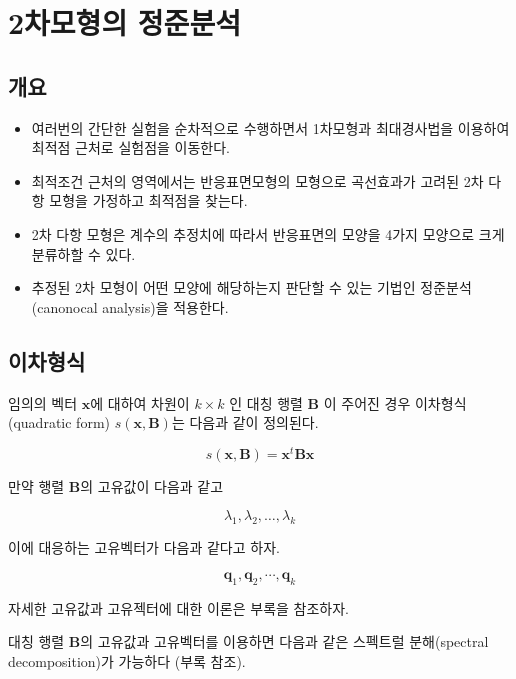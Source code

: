 \documentclass[
]{book}
\newcommand{\bm}[1]{\boldsymbol{\mathbf{#1}}}
\theoremstyle{definition}
\theoremstyle{definition}
\theoremstyle{definition}
\theoremstyle{definition}
\theoremstyle{remark}
\begin{document}
\hypertarget{canonocal}{%
\chapter{2차모형의 정준분석}\label{canonocal}}

\hypertarget{uxac1cuxc694-2}{%
\section{개요}\label{uxac1cuxc694-2}}

\begin{itemize}
\item
  여러번의 간단한 실험을 순차적으로 수행하면서 1차모형과 최대경사법을 이용하여 최적점 근처로 실험점을 이동한다.
\item
  최적조건 근처의 영역에서는 반응표면모형의 모형으로 곡선효과가 고려된 2차 다항 모형을 가정하고 최적점을 찾는다.
\item
  2차 다항 모형은 계수의 추정치에 따라서 반응표면의 모양을 4가지 모양으로 크게 분류하할 수 있다.
\item
  추정된 2차 모형이 어떤 모양에 해당하는지 판단할 수 있는 기법인 정준분석(canonocal analysis)을 적용한다.
\end{itemize}

\hypertarget{uxc774uxcc28uxd615uxc2dd}{%
\section{이차형식}\label{uxc774uxcc28uxd615uxc2dd}}

임의의 벡터 \(\bm x\)에 대하여 차원이 \(k \times k\) 인 대칭 행렬 \(\bm B\) 이 주어진 경우 이차형식(quadratic form) \(s(\bm x, \bm B)\)는 다음과 같이 정의된다.

\begin{equation}
s(\bm x, \bm B) = {\bm x}^t \bm B \bm x 
\label{eq:quadform}
\end{equation}

만약 행렬 \(\bm B\)의 고유값이 다음과 같고

\[ \lambda_1 ,\lambda_2 , \dots , \lambda_k \]

이에 대응하는 고유벡터가 다음과 같다고 하자.

\[  \bm q_1, \bm q_2 , \cdots , \bm q_k \]

자세한 고유값과 고유젝터에 대한 이론은 부록을 참조하자.

대칭 행렬 \(\bm B\)의 고유값과 고유벡터를 이용하면 다음과 같은 스펙트럴 분해(spectral decomposition)가 가능하다 (부록 참조).
\end{document}
